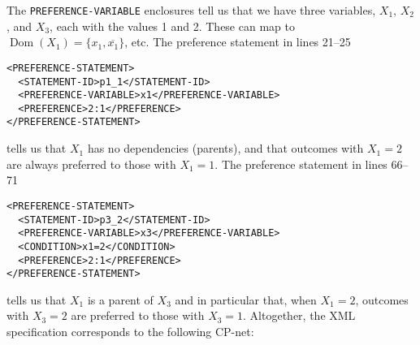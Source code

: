 \documentclass{article}
\DeclareMathOperator{\dom}{Dom}
\begin{document}
The \texttt{PREFERENCE-VARIABLE} enclosures tell us that we have three
variables, $X_1$, $X_2$, and $X_3$, each with the values 1 and 2.
These can map to $\dom(X_1) = \{x_1, \overline{x_1}\}$, etc.
The preference statement in lines 21--25
\begin{verbatim}
<PREFERENCE-STATEMENT>
  <STATEMENT-ID>p1_1</STATEMENT-ID>
  <PREFERENCE-VARIABLE>x1</PREFERENCE-VARIABLE>
  <PREFERENCE>2:1</PREFERENCE>
</PREFERENCE-STATEMENT>
\end{verbatim}
tells us that $X_1$ has no dependencies (parents), and that outcomes
with $X_1=2$ are always preferred to those with $X_1=1$.  The 
preference statement in lines 66--71
\begin{verbatim}
<PREFERENCE-STATEMENT>
  <STATEMENT-ID>p3_2</STATEMENT-ID>
  <PREFERENCE-VARIABLE>x3</PREFERENCE-VARIABLE>
  <CONDITION>x1=2</CONDITION>
  <PREFERENCE>2:1</PREFERENCE>
</PREFERENCE-STATEMENT>
\end{verbatim}
tells us that $X_1$ is a parent of $X_3$ and in particular that, when
$X_1=2$, outcomes with $X_3=2$ are preferred to those with $X_3=1$.
Altogether, the XML specification corresponds to the following CP-net:
\begin{center}
\end{center}
  
\end{document}
